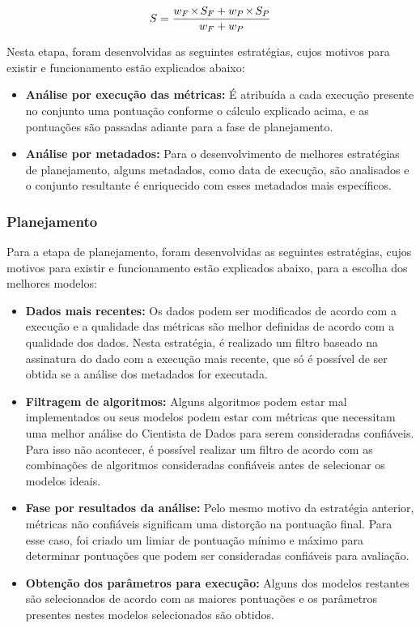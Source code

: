 \documentclass[portugues]{ic-tese}
\let\oldtimes\times
\def\times{{\mkern1mu\oldtimes\mkern1mu}}
\begin{document}
\begin{equation}
\label{eqn:totalScore}
	S = \frac{w_F \times S_F + w_P \times S_P}{w_F + w_P}
\end{equation}

Nesta etapa, foram desenvolvidas as seguintes estratégias, cujos motivos para existir e funcionamento estão explicados abaixo:

\begin{itemize}
\item \textbf{Análise por execução das métricas:} É atribuída a cada execução presente no conjunto uma pontuação conforme o cálculo explicado acima, e as pontuações são passadas adiante para a fase de planejamento.
\item \textbf{Análise por metadados:} Para o desenvolvimento de melhores estratégias de planejamento, alguns metadados, como data de execução, são analisados e o conjunto resultante é enriquecido com esses metadados mais específicos.
\end{itemize}

\subsubsection{Planejamento}

Para a etapa de planejamento, foram desenvolvidas as seguintes estratégias, cujos motivos para existir e funcionamento estão explicados abaixo, para a escolha dos melhores modelos:

\begin{itemize}
\item \textbf{Dados mais recentes:} Os dados podem ser modificados de acordo com a execução e a qualidade das métricas são melhor definidas de acordo com a qualidade dos dados. Nesta estratégia, é realizado um filtro baseado na assinatura do dado com a execução mais recente, que só é possível de ser obtida se a análise dos metadados for executada.
\item \textbf{Filtragem de algoritmos:} Alguns algoritmos podem estar mal implementados ou seus modelos podem estar com métricas que necessitam uma melhor análise do Cientista de Dados para serem consideradas confiáveis. Para isso não acontecer, é possível realizar um filtro de acordo com as combinações de algoritmos consideradas confiáveis antes de selecionar os modelos ideais.
\item \textbf{Fase por resultados da análise:} Pelo mesmo motivo da estratégia anterior, métricas não confiáveis significam uma distorção na pontuação final. Para esse caso, foi criado um limiar de pontuação mínimo e máximo para determinar pontuações que podem ser consideradas confiáveis para avaliação.
\item \textbf{Obtenção dos parâmetros para execução:} Alguns dos modelos restantes são selecionados de acordo com as maiores pontuações e os parâmetros presentes nestes modelos selecionados são obtidos.
\end{itemize}
\end{document}
